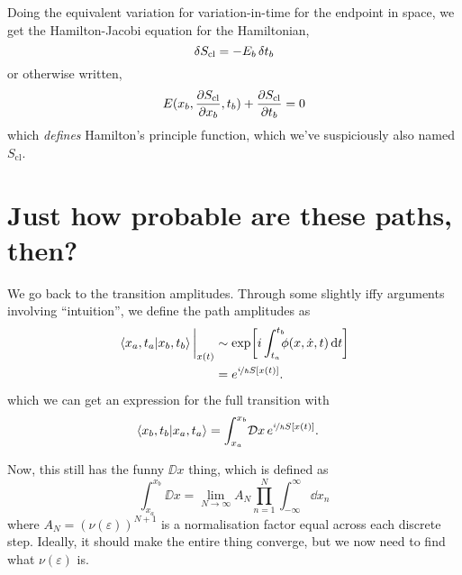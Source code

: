 \documentclass[]{revision-notes}
\begin{document}
Doing the equivalent variation for variation-in-time for the endpoint in space, we get the Hamilton-Jacobi equation for the Hamiltonian, \[\variation{S_{\mathrm{cl}} = - E_b \variation{t_b}}\] or otherwise written,
\[E(x_b, \pdv{S_{\mathrm{cl}}}{x_b}, t_b) + \pdv{S_{\mathrm{cl}}}{t_b} = 0\] which \emph{defines} Hamilton's principle function, which we've suspiciously also named \(S_{\mathrm{cl}}\).

\section{Just how probable are these paths, then?}
We go back to the transition amplitudes.
Through some slightly iffy arguments involving ``intuition'', we define the path amplitudes as
\begin{align*}
  \eval{\braket{x_a, t_a}{x_b, t_b}}_{x(t)} &\sim \exp[i\int_{t_a}^{t_b} \!\!\!\phi(x, \dot x, t) \dd{t}]\\
  &= e^{\nicefrac{i}{\hbar} S[x(t)]}.
\end{align*}
which we can get an expression for the full transition with
\begin{align*}
  \braket{x_b, t_b}{x_a, t_a} &= \int_{x_a}^{x_b}\!\mathcal{D} x\, e^{\nicefrac{i}{\hbar} S[x(t)]}.
\end{align*}

Now, this still has the funny \(\DD{x}\) thing, which is defined as
\[\int_{x_a}^{x_b}\!\DD{x} = \lim_{N\to \infty} A_N \prod_{n=1}^N \int_{-\infty}^{\infty} \dd{x_{n}} \] where \(A_N = (\nu(\varepsilon))^{N+1}\) is a normalisation factor equal across each discrete step.
Ideally, it should make the entire thing converge, but we now need to find what \(\nu(\varepsilon)\) is.
\end{document}
